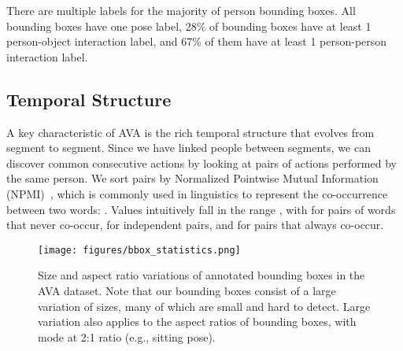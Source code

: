\documentclass[10pt,twocolumn,letterpaper]{article}
\begin{document}
There are multiple labels for the majority of person bounding boxes. All bounding boxes have one pose label, 28\% of bounding boxes have at least 1 person-object interaction label, and 67\% of them have at least 1 person-person interaction label.

\subsection{Temporal Structure}
\label{sec:temp_structure}

A key characteristic of AVA is the rich temporal structure that evolves from segment to segment. Since we have linked people between segments, we can discover common consecutive actions by looking at pairs of actions performed by the same person. We sort pairs by Normalized Pointwise Mutual Information (NPMI)~\cite{Church1990}, which is commonly used in linguistics to represent the co-occurrence between two words: . Values intuitively fall in the range , with  for pairs of words that never co-occur,  for independent pairs, and  for pairs that always co-occur.

\begin{figure}[tbp]
\centering
\texttt{[image: figures/bbox\_statistics.png]}
\caption{Size and aspect ratio variations of annotated bounding boxes in the AVA dataset. Note that our bounding boxes consist of a large variation of sizes, many of which are small and hard to detect. Large variation also applies to the aspect ratios of bounding boxes, with mode at 2:1 ratio (e.g., sitting pose).}
\label{fig:bbox_stats}
\vspace{-1em}
\end{figure}
\end{document}
